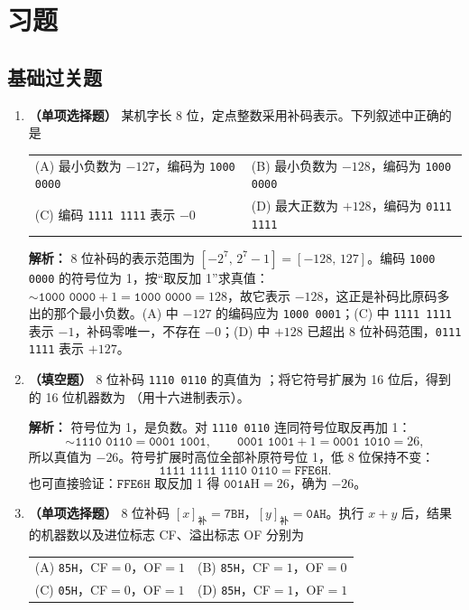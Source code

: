 \section{习题}

\subsection{基础过关题}

\begin{enumerate}

\item \textbf{（单项选择题）} 某机字长 8 位，定点整数采用补码表示。下列叙述中正确的是
\begin{center}
\begin{tabular}{ll}
(A) 最小负数为 $-127$，编码为 \texttt{1000 0000} & (B) 最小负数为 $-128$，编码为 \texttt{1000 0000} \\[4pt]
(C) 编码 \texttt{1111 1111} 表示 $-0$ & (D) 最大正数为 $+128$，编码为 \texttt{0111 1111}
\end{tabular}
\end{center}

\ifshowsolutions\par\noindent\textbf{解析：} 8 位补码的表示范围为 $[-2^{7},\,2^{7}-1]=[-128,\,127]$。编码 \texttt{1000 0000} 的符号位为 1，按“取反加 1”求真值：$\sim\!\texttt{1000 0000}+1=\texttt{1000 0000}=128$，故它表示 $-128$，这正是补码比原码多出的那个最小负数。(A) 中 $-127$ 的编码应为 \texttt{1000 0001}；(C) 中 \texttt{1111 1111} 表示 $-1$，补码零唯一，不存在 $-0$；(D) 中 $+128$ 已超出 8 位补码范围，\texttt{0111 1111} 表示 $+127$。\else \answerarea \fi

\item \textbf{（填空题）} 8 位补码 \texttt{1110 0110} 的真值为 \underline{\qquad\qquad}；将它符号扩展为 16 位后，得到的 16 位机器数为 \underline{\qquad\qquad}（用十六进制表示）。

\ifshowsolutions\par\noindent\textbf{解析：} 符号位为 1，是负数。对 \texttt{1110 0110} 连同符号位取反再加 1：
\[
\sim\!\texttt{1110 0110}=\texttt{0001 1001},\qquad
\texttt{0001 1001}+1=\texttt{0001 1010}=26,
\]
所以真值为 $-26$。符号扩展时高位全部补原符号位 1，低 8 位保持不变：
\[
\texttt{1111 1111 1110 0110}=\texttt{FFE6H}.
\]
也可直接验证：$\texttt{FFE6H}$ 取反加 1 得 $\texttt{001A}\text{H}=26$，确为 $-26$。\else \answerarea \fi

\item \textbf{（单项选择题）} 8 位补码 $[x]_{\text{补}}=\texttt{7BH}$，$[y]_{\text{补}}=\texttt{0AH}$。执行 $x+y$ 后，结果的机器数以及进位标志 CF、溢出标志 OF 分别为
\begin{center}
\begin{tabular}{ll}
(A) \texttt{85H}，CF$=0$，OF$=1$ & (B) \texttt{85H}，CF$=1$，OF$=0$ \\[4pt]
(C) \texttt{05H}，CF$=0$，OF$=1$ & (D) \texttt{85H}，CF$=1$，OF$=1$
\end{tabular}
\end{center}


\end{enumerate}
